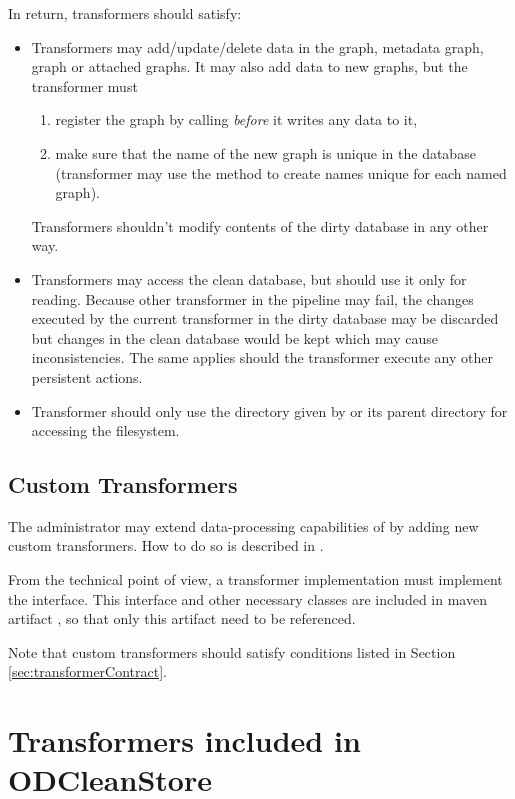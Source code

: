 In return, transformers should satisfy:

\begin{itemize}
  \item Transformers may add/update/delete data in the  graph, metadata graph,  graph or attached graphs. It may also add data to new graphs, but the transformer must
		\begin{enumerate}
			\item register the graph by calling  \textit{before} it writes any data to it,
			\item make sure that the name of the new graph is unique in the database (transformer may use the  method to create names unique for each named graph).
		\end{enumerate}
		Transformers shouldn't modify contents of the dirty database in any other way.
	\item Transformers may access the clean database, but should use it only for reading. Because other transformer in the pipeline may fail, the changes executed by the current transformer in the dirty database may be discarded but changes in the clean database would be kept which may cause inconsistencies. The same applies should the transformer execute any other persistent actions.
	\item Transformer should only use the directory given by  or its parent directory for accessing the filesystem.
\end{itemize}

\section{Custom Transformers}
\label{sec:customTransformers}
The administrator may extend data-processing capabilities of \odcs by adding new custom transformers. How to do so is described in .

From the technical point of view, a transformer implementation must implement the  interface. This interface and other necessary classes are included in maven artifact , so that only this artifact need to be referenced.

Note that custom transformers should satisfy conditions listed in Section \ref{sec:transformerContract}.

\chapter{Transformers included in ODCleanStore}

